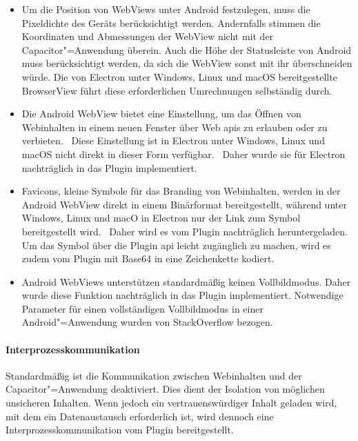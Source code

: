 \begin{itemize}
  \setlength\itemsep{-0.5em}
  \item
  Um die Position von WebViews unter Android festzulegen, muss die Pixeldichte des Geräts berücksichtigt werden.
  Andernfalls stimmen die Koordinaten und Abmessungen der WebView nicht mit der Capacitor"=Anwendung überein.
  Auch die Höhe der Statusleiste von Android muss berücksichtigt werden, da sich die WebView sonst mit ihr überschneiden würde.
  Die von Electron unter Windows, Linux und macOS bereitgestellte BrowserView führt diese erforderlichen Umrechnungen selbständig durch.
  \item
  Die Android WebView bietet eine Einstellung, um das Öffnen von Webinhalten in einem neuen Fenster über Web \acp{api} zu erlauben oder zu verbieten.~\cite{android:api}
  Diese Einstellung ist in Electron unter Windows, Linux und macOS nicht direkt in dieser Form verfügbar.~\cite{electron:docs}
  Daher wurde sie für Electron nachträglich in das Plugin implementiert.
  \item
  Favicons, kleine Symbole für das Branding von Webinhalten, werden in der Android WebView direkt in einem Binärformat bereitgestellt,
  während unter Windows, Linux und macO in Electron nur der Link zum Symbol bereitgestellt wird.~\cite{android:api, electron:docs}
  Daher wird es vom Plugin nachträglich heruntergeladen.
  Um das Symbol über die Plugin \ac{api} leicht zugänglich zu machen, wird es zudem vom Plugin mit Base64 in eine Zeichenkette kodiert.
  \item
  Android WebViews unterstützen standardmäßig keinen Vollbildmodus.
  Daher wurde diese Funktion nachträglich in das Plugin implementiert.
  Notwendige Parameter für einen vollständigen Vollbildmodus in einer Android"=Anwendung wurden von StackOverflow bezogen.
  \cite{android:api, stackoverflow}
\end{itemize}

\newpage

\paragraph{Interprozesskommunikation}

Standardmäßig ist die Kommunikation zwischen Webinhalten und der Capacitor"=Anwendung deaktiviert.
Dies dient der Isolation von möglichen unsicheren Inhalten.
Wenn jedoch ein vertrauenswürdiger Inhalt geladen wird, mit dem ein Datenaustausch erforderlich ist, wird dennoch eine Interprozesskommunikation vom Plugin bereitgestellt.

